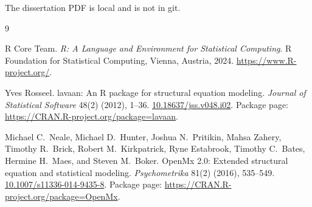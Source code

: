 \documentclass[11pt]{article}
\begin{document}
The dissertation PDF is local and is not in git.

\begin{thebibliography}{9}

R Core Team.
\emph{R: A Language and Environment for Statistical Computing}.
R Foundation for Statistical Computing, Vienna, Austria, 2024.
\url{https://www.R-project.org/}.

Yves Rosseel.
lavaan: An R package for structural equation modeling.
\emph{Journal of Statistical Software} 48(2) (2012), 1--36.
\href{https://doi.org/10.18637/jss.v048.i02}{10.18637/jss.v048.i02}.
Package page: \url{https://CRAN.R-project.org/package=lavaan}.

Michael C.~Neale, Michael D.~Hunter, Joshua N.~Pritikin, Mahsa Zahery,
Timothy R.~Brick, Robert M.~Kirkpatrick, Ryne Estabrook,
Timothy C.~Bates, Hermine H.~Maes, and Steven M.~Boker.
OpenMx 2.0: Extended structural equation and statistical modeling.
\emph{Psychometrika} 81(2) (2016), 535--549.
\href{https://doi.org/10.1007/s11336-014-9435-8}{10.1007/s11336-014-9435-8}.
Package page: \url{https://CRAN.R-project.org/package=OpenMx}.

\end{thebibliography}
\end{document}
